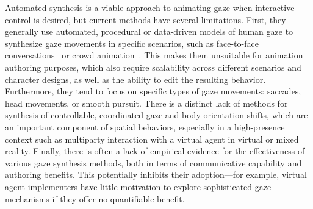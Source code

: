 Automated synthesis is a viable approach to animating gaze when interactive control is desired, but current methods have several limitations. First, they generally use automated, procedural or data-driven models of human gaze to synthesize gaze movements in specific scenarios, such as face-to-face conversations~\cite{a few conv. gaze papers} or crowd animation~\cite{crowd gaze}. This makes them unsuitable for animation authoring purposes, which also require scalability across different scenarios and character designs, as well as the ability to edit the resulting behavior. Furthermore, they tend to focus on specific types of gaze movements: saccades, head movements, or smooth pursuit. There is a distinct lack of methods for synthesis of controllable, coordinated gaze and body orientation shifts, which are an important component of spatial behaviors, especially in a high-presence context such as multiparty interaction with a virtual agent in virtual or mixed reality. Finally, there is often a lack of empirical evidence for the effectiveness of various gaze synthesis methods, both in terms of communicative capability and authoring benefits. This potentially inhibits their adoption---for example, virtual agent implementers have little motivation to explore sophisticated gaze mechanisms if they offer no quantifiable benefit.


